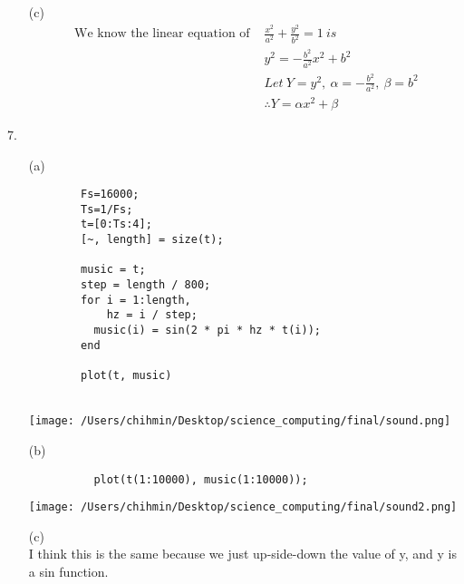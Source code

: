\documentclass{article}
\begin{document}
\begin{enumerate*}
\begin{enumerate}
        \item [(c)] \text{}
          \begin{align*}
            \text{We know the linear equation of } & \frac{x^2}{a^2}+\frac{y^2}{b^2}=1\ is \\
            & y^2 = -\frac{b^2}{a^2}x^2+b^2\\
            & Let\  Y=y^2,\ \alpha=-\frac{b^2}{a^2},\ \beta=b^2 \\
            & \therefore Y = \alpha x^2+\beta
          \end{align*}
     \end{enumerate}
     \item [7.]
      \begin{enumerate}
        \item [(a)] \text{} \\
        \begin{lstlisting}
        Fs=16000;
        Ts=1/Fs;
        t=[0:Ts:4];
        [~, length] = size(t);

        music = t;
        step = length / 800; 
        for i = 1:length,
            hz = i / step;
          music(i) = sin(2 * pi * hz * t(i));
        end

        plot(t, music)
        \end{lstlisting} \ \\
        \texttt{[image: /Users/chihmin/Desktop/science\_computing/final/sound.png]}

        \item [(b)] \text{} \\
        \begin{lstlisting}
          plot(t(1:10000), music(1:10000)); 
        \end{lstlisting} 
        \texttt{[image: /Users/chihmin/Desktop/science\_computing/final/sound2.png]}
        
        \item [(c)] \text{} \\
        I think this is the same because we just up-side-down the value of y, and y is a sin function.
      \end{enumerate}
        
  \end{enumerate*}
\end{document}
